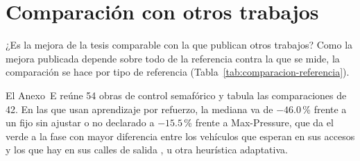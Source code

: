 \section{Comparación con otros trabajos}
\label{sec:comparacion-literatura}
\suppressfloats[t]

¿Es la mejora de la tesis comparable con la que publican otros
trabajos? Como la mejora publicada depende sobre todo de la referencia
contra la que se mide, la comparación se hace por tipo de referencia
(Tabla~\ref{tab:comparacion-referencia}).

El Anexo~E reúne 54 obras de control semafórico y tabula las
comparaciones de 42. En las que usan aprendizaje por refuerzo, la
mediana va de $-46.0$\,\% frente a un fijo sin ajustar o no declarado a
$-15.5$\,\% frente a Max-Pressure, que da el verde a la fase con mayor
diferencia entre los vehículos que esperan en sus accesos y los que hay
en sus calles de salida \citep{Varaiya2013_MaxPressure}, u otra
heurística adaptativa.

